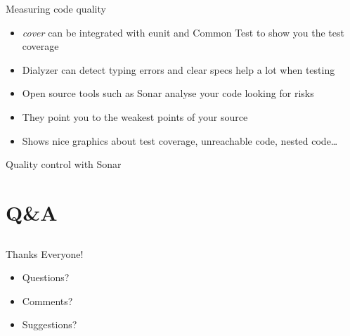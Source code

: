\documentclass[aspectratio=169]{beamer}
\begin{document}
\begin{frame}{Measuring code quality}
    \begin{itemize}
    \item \emph{cover} can be integrated with eunit and Common Test to show you the test coverage
    \pause
    \item Dialyzer can detect typing errors and clear specs help a lot when testing
    \pause
    \item Open source tools such as Sonar analyse your code looking for risks
    \pause
    \item They point you to the weakest points of your source
    \pause
    \item Shows nice graphics about test coverage, unreachable code, nested code\dots
    \end{itemize}
\end{frame}

\begin{frame}{Quality control with Sonar}
\end{frame}

\section{Q\&A}
\subsection{}

\begin{frame}{Thanks Everyone!}
    \begin{itemize}
    \item Questions?
    \item Comments?
    \item Suggestions?
    \end{itemize}
\end{frame}
%
%
%
%
%
%
\end{document}

